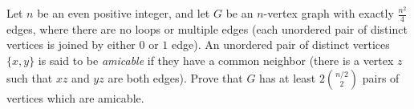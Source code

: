 Let $n$ be an even positive integer, and let $G$ be an $n$-vertex graph with exactly $\tfrac{n^2}{4}$ edges, where there are no loops or multiple edges (each unordered pair of distinct vertices is joined by either $0$ or $1$ edge). An unordered pair of distinct vertices $\{x,y\}$ is said to be \emph{amicable} if they have a common neighbor (there is a vertex $z$ such that $xz$ and $yz$ are both edges). Prove that $G$ has at least $2\textstyle\binom{n/2}{2}$ pairs of vertices which are amicable.